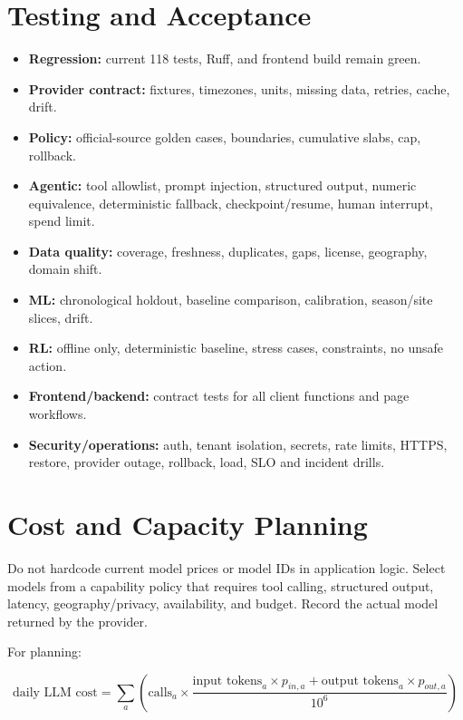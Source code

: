 \section{Testing and Acceptance}

\begin{itemize}
  \item \textbf{Regression:} current 118 tests, Ruff, and frontend build remain green.
  \item \textbf{Provider contract:} fixtures, timezones, units, missing data, retries, cache, drift.
  \item \textbf{Policy:} official-source golden cases, boundaries, cumulative slabs, cap, rollback.
  \item \textbf{Agentic:} tool allowlist, prompt injection, structured output, numeric equivalence,
        deterministic fallback, checkpoint/resume, human interrupt, spend limit.
  \item \textbf{Data quality:} coverage, freshness, duplicates, gaps, license, geography, domain shift.
  \item \textbf{ML:} chronological holdout, baseline comparison, calibration, season/site slices, drift.
  \item \textbf{RL:} offline only, deterministic baseline, stress cases, constraints, no unsafe action.
  \item \textbf{Frontend/backend:} contract tests for all client functions and page workflows.
  \item \textbf{Security/operations:} auth, tenant isolation, secrets, rate limits, HTTPS, restore,
        provider outage, rollback, load, SLO and incident drills.
\end{itemize}

\section{Cost and Capacity Planning}

Do not hardcode current model prices or model IDs in application logic. Select models from a
capability policy that requires tool calling, structured output, latency, geography/privacy,
availability, and budget. Record the actual model returned by the provider.

For planning:

\[
\text{daily LLM cost} =
\sum_a \left(
  \text{calls}_a \times
  \frac{\text{input tokens}_a \times p_{in,a} +
        \text{output tokens}_a \times p_{out,a}}{10^6}
\right)
\]

